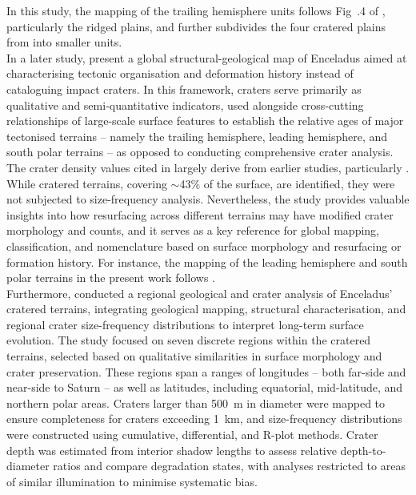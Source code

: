\documentclass[preprint,11pt,3p,times,authoryear]{elsarticle}
\begin{document}
In this study, the mapping of the trailing hemisphere units follows Fig~.4 of \citet{Kirchoff2009}, particularly the ridged plains, and further subdivides the four cratered plains from \citet{Kirchoff2009} into smaller units.\\

In a later study, \citet{CrowWillard2015} present a global structural-geological map of Enceladus aimed at characterising tectonic organisation and deformation history instead of  cataloguing impact craters. In this framework, craters serve primarily as qualitative and semi-quantitative indicators, used alongside cross-cutting relationships of large-scale surface features to establish the relative ages of major tectonised terrains -- namely the trailing hemisphere, leading hemisphere, and south polar terrains -- as opposed to conducting comprehensive crater analysis. The crater density values cited in \citet{CrowWillard2015} largely derive from earlier studies, particularly \citet{Kirchoff2009}. While cratered terrains, covering $\sim$43\% of the surface, are identified, they were not subjected to size-frequency analysis. Nevertheless, the study provides valuable insights into how resurfacing across different terrains may have modified crater morphology and counts, and it serves as a key reference for global mapping, classification, and nomenclature based on surface morphology and resurfacing or formation history. For instance, the mapping of the leading hemisphere and south polar terrains in the present work follows \citet{CrowWillard2015}.\\

Furthermore, \citet{Kinczyk2024} conducted a regional geological and crater analysis of Enceladus’ cratered terrains, integrating geological mapping, structural characterisation, and regional crater size-frequency distributions to interpret long-term surface evolution. The study focused on seven discrete regions within the cratered terrains, selected based on qualitative similarities in surface morphology and crater preservation. These regions span a ranges of longitudes -- both far-side and near-side to Saturn -- as well as latitudes, including equatorial, mid-latitude, and northern polar areas. Craters larger than 500~m in diameter were mapped to ensure completeness for craters exceeding 1~km, and size-frequency distributions were constructed using cumulative, differential, and R-plot methods. Crater depth was estimated from interior shadow lengths to assess relative depth-to-diameter ratios and compare degradation states, with analyses restricted to areas of similar illumination to minimise systematic bias.\\
\end{document}
